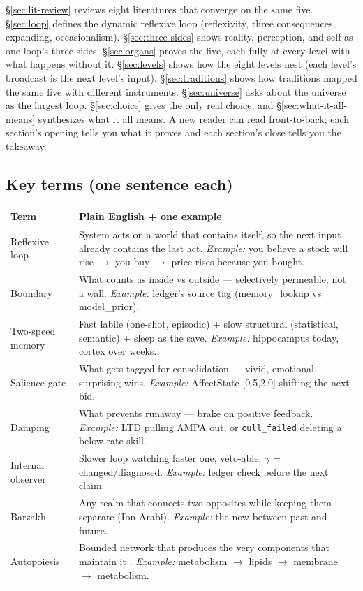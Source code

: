 \documentclass[11pt]{article}
\begin{document}
\S\ref{sec:lit-review} reviews eight literatures that converge on the same five. \S\ref{sec:loop} defines the dynamic reflexive loop (reflexivity, three consequences, expanding, occasionalism). \S\ref{sec:three-sides} shows reality, perception, and self as one loop's three sides. \S\ref{sec:organs} proves the five, each fully at every level with what happens without it. \S\ref{sec:levels} shows how the eight levels nest (each level's broadcast is the next level's input). \S\ref{sec:traditions} shows how traditions mapped the same five with different instruments. \S\ref{sec:universe} asks about the universe as the largest loop. \S\ref{sec:choice} gives the only real choice, and \S\ref{sec:what-it-all-means} synthesizes what it all means. A new reader can read front-to-back; each section's opening tells you what it proves and each section's close tells you the takeaway.

\subsection*{Key terms (one sentence each)}

\begin{center}
\small
\begin{tabular}{p{3.2cm}p{9.2cm}}
\toprule
Term & Plain English + one example \\
\midrule
Reflexive loop & System acts on a world that contains itself, so the next input already contains the last act. \emph{Example:} you believe a stock will rise $\to$ you buy $\to$ price rises because you bought. \\
Boundary & What counts as inside vs outside --- selectively permeable, not a wall. \emph{Example:} ledger's source tag (memory\_lookup vs model\_prior). \\
Two-speed memory & Fast labile (one-shot, episodic) + slow structural (statistical, semantic) + sleep as the save. \emph{Example:} hippocampus today, cortex over weeks. \\
Salience gate & What gets tagged for consolidation --- vivid, emotional, surprising wins. \emph{Example:} AffectState [0.5,2.0] shifting the next bid. \\
Damping & What prevents runaway --- brake on positive feedback. \emph{Example:} LTD pulling AMPA out, or \texttt{cull\_failed} deleting a below-rate skill. \\
Internal observer & Slower loop watching faster one, veto-able; $\gamma$ = changed/diagnosed. \emph{Example:} ledger check before the next claim. \\
Barzakh & Any realm that connects two opposites while keeping them separate (Ibn Arabi). \emph{Example:} the now between past and future. \\
Autopoiesis & Bounded network that produces the very components that maintain it \citep{maturana1980}. \emph{Example:} metabolism $\to$ lipids $\to$ membrane $\to$ metabolism. \\
\bottomrule
\end{tabular}
\end{center}
\end{document}

